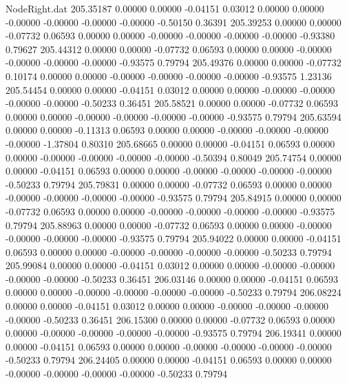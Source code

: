 \begin{filecontents}{NodeRight.dat}
 205.35187    0.00000    0.00000    -0.04151    0.03012    0.00000    0.00000   -0.00000   -0.00000   -0.00000   -0.00000   -0.50150    0.36391
 205.39253    0.00000    0.00000    -0.07732    0.06593    0.00000    0.00000   -0.00000   -0.00000   -0.00000   -0.00000   -0.93380    0.79627
 205.44312    0.00000    0.00000    -0.07732    0.06593    0.00000    0.00000   -0.00000   -0.00000   -0.00000   -0.00000   -0.93575    0.79794
 205.49376    0.00000    0.00000    -0.07732    0.10174    0.00000    0.00000   -0.00000   -0.00000   -0.00000   -0.00000   -0.93575    1.23136
 205.54454    0.00000    0.00000    -0.04151    0.03012    0.00000    0.00000   -0.00000   -0.00000   -0.00000   -0.00000   -0.50233    0.36451
 205.58521    0.00000    0.00000    -0.07732    0.06593    0.00000    0.00000   -0.00000   -0.00000   -0.00000   -0.00000   -0.93575    0.79794
 205.63594    0.00000    0.00000    -0.11313    0.06593    0.00000    0.00000   -0.00000   -0.00000   -0.00000   -0.00000   -1.37804    0.80310
 205.68665    0.00000    0.00000    -0.04151    0.06593    0.00000    0.00000   -0.00000   -0.00000   -0.00000   -0.00000   -0.50394    0.80049
 205.74754    0.00000    0.00000    -0.04151    0.06593    0.00000    0.00000   -0.00000   -0.00000   -0.00000   -0.00000   -0.50233    0.79794
 205.79831    0.00000    0.00000    -0.07732    0.06593    0.00000    0.00000   -0.00000   -0.00000   -0.00000   -0.00000   -0.93575    0.79794
 205.84915    0.00000    0.00000    -0.07732    0.06593    0.00000    0.00000   -0.00000   -0.00000   -0.00000   -0.00000   -0.93575    0.79794
 205.88963    0.00000    0.00000    -0.07732    0.06593    0.00000    0.00000   -0.00000   -0.00000   -0.00000   -0.00000   -0.93575    0.79794
 205.94022    0.00000    0.00000    -0.04151    0.06593    0.00000    0.00000   -0.00000   -0.00000   -0.00000   -0.00000   -0.50233    0.79794
 205.99084    0.00000    0.00000    -0.04151    0.03012    0.00000    0.00000   -0.00000   -0.00000   -0.00000   -0.00000   -0.50233    0.36451
 206.03146    0.00000    0.00000    -0.04151    0.06593    0.00000    0.00000   -0.00000   -0.00000   -0.00000   -0.00000   -0.50233    0.79794
 206.08224    0.00000    0.00000    -0.04151    0.03012    0.00000    0.00000   -0.00000   -0.00000   -0.00000   -0.00000   -0.50233    0.36451
 206.15300    0.00000    0.00000    -0.07732    0.06593    0.00000    0.00000   -0.00000   -0.00000   -0.00000   -0.00000   -0.93575    0.79794
 206.19341    0.00000    0.00000    -0.04151    0.06593    0.00000    0.00000   -0.00000   -0.00000   -0.00000   -0.00000   -0.50233    0.79794
 206.24405    0.00000    0.00000    -0.04151    0.06593    0.00000    0.00000   -0.00000   -0.00000   -0.00000   -0.00000   -0.50233    0.79794

\end{filecontents}
